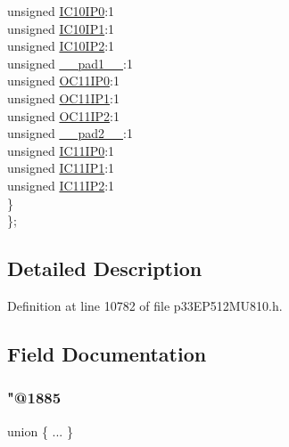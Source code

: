 \begin{DoxyCompactItemize}
\begin{tabbing}
\>\>unsigned \hyperlink{structtag_i_p_c31_b_i_t_s_afd3c35712d0dfc5c678eb9fe90ca7e4e}{IC10IP0}:1\\
\>\>unsigned \hyperlink{structtag_i_p_c31_b_i_t_s_ac055e72c9d1e2bb3272015c57e6d1cdc}{IC10IP1}:1\\
\>\>unsigned \hyperlink{structtag_i_p_c31_b_i_t_s_ade190a3a5d28826a1ce24ddcc56c8fba}{IC10IP2}:1\\
\>\>unsigned \hyperlink{structtag_i_p_c31_b_i_t_s_acaf2d0924a107ec6e8d2e31febaf66f9}{\_\_pad1\_\_}:1\\
\>\>unsigned \hyperlink{structtag_i_p_c31_b_i_t_s_a462e57dba66ed62c25e6b83c3a0bdf1c}{OC11IP0}:1\\
\>\>unsigned \hyperlink{structtag_i_p_c31_b_i_t_s_aac8dbec9a1abda3b964f9c3ac4707295}{OC11IP1}:1\\
\>\>unsigned \hyperlink{structtag_i_p_c31_b_i_t_s_aa321649a3fd9eac67a43c337d8b82bb5}{OC11IP2}:1\\
\>\>unsigned \hyperlink{structtag_i_p_c31_b_i_t_s_a4d97cc5f7d51d22fc2bf3eab35c9cb7f}{\_\_pad2\_\_}:1\\
\>\>unsigned \hyperlink{structtag_i_p_c31_b_i_t_s_aa7c5bd5ec26085679fb67d50425500f4}{IC11IP0}:1\\
\>\>unsigned \hyperlink{structtag_i_p_c31_b_i_t_s_aa563327288f85906d1f8a91f9463d08e}{IC11IP1}:1\\
\>\>unsigned \hyperlink{structtag_i_p_c31_b_i_t_s_a3e1733f8a7684fae6914bd58b4fdd5c4}{IC11IP2}:1\\
\>\} \\
\}; \\

\end{tabbing}\end{DoxyCompactItemize}


\subsection{Detailed Description}


Definition at line 10782 of file p33\+E\+P512\+M\+U810.\+h.



\subsection{Field Documentation}
\mbox{\label{structtag_i_p_c31_b_i_t_s_a9f1520a1d152e6f5148081ff0b697c20}} 
\subsubsection{\texorpdfstring{"@1885}{@1885}}
{\footnotesize\ttfamily union \{ ... \} }

